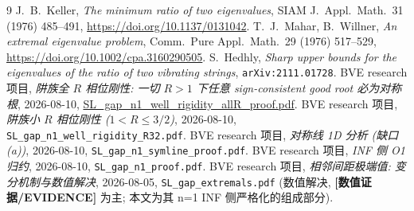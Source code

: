 \documentclass[UTF8]{ctexart}
\newcommand{\EVID}{\textbf{[数值证据/EVIDENCE]}}
\begin{document}
\begin{thebibliography}{9}\sloppy
	 J.\ B.\ Keller, \emph{The minimum ratio of two eigenvalues},
		SIAM J.\ Appl.\ Math.\ 31 (1976) 485--491, \url{https://doi.org/10.1137/0131042}.
	 T.\ J.\ Mahar, B.\ Willner, \emph{An extremal eigenvalue problem},
		Comm.\ Pure Appl.\ Math.\ 29 (1976) 517--529, \url{https://doi.org/10.1002/cpa.3160290505}.
	 S.\ Hedhly, \emph{Sharp upper bounds for the eigenvalues of the
		ratio of two vibrating strings}, \texttt{arXiv:2111.01728}.
	 BVE research 项目, \emph{阱族全 $R$ 相位刚性: 一切 $R>1$ 下任意
		sign-consistent good root 必为对称根}, 2026-08-10,
		\url{SL_gap_n1_well_rigidity_allR_proof.pdf}.
	 BVE research 项目, \emph{阱族小 $R$ 相位刚性 ($1<R\le3/2$)},
		2026-08-10, \texttt{SL\_gap\_n1\_well\_rigidity\_R32.pdf}.
	 BVE research 项目, \emph{对称线 1D 分析 (缺口 (a))},
		2026-08-10, \texttt{SL\_gap\_n1\_symline\_proof.pdf}.
	 BVE research 项目, \emph{INF 侧 O1 归约}, 2026-08-10,
		\texttt{SL\_gap\_n1\_proof.pdf}.
	 BVE research 项目, \emph{相邻间距极端值: 变分机制与数值解决},
		2026-08-05, \texttt{SL\_gap\_extremals.pdf} (数值解决, \EVID{} 为主;
		本文为其 n=1 INF 侧严格化的组成部分).
\end{thebibliography}
\end{document}

